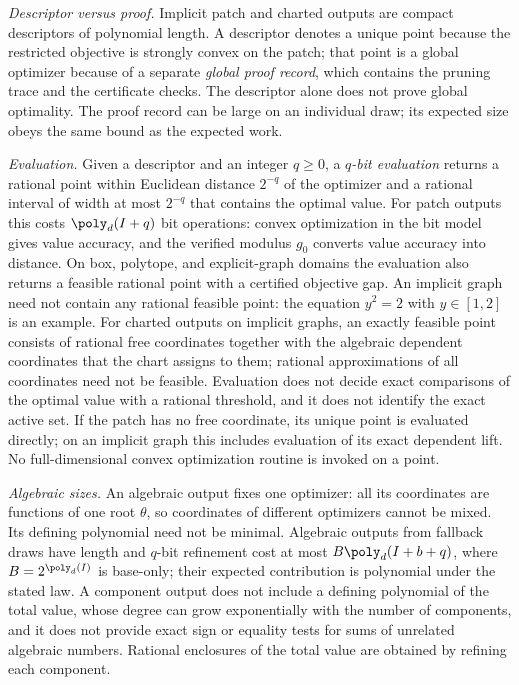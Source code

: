 \emph{Descriptor versus proof.} Implicit patch and charted outputs are
compact descriptors of polynomial length. A descriptor denotes a unique
point because the restricted objective is strongly convex on the patch;
that point is a global optimizer because of a separate \emph{global proof
record}, which contains the pruning trace and the certificate checks. The
descriptor alone does not prove global optimality. The proof record can be
large on an individual draw; its expected size obeys the same bound as the
expected work.

\emph{Evaluation.} Given a descriptor and an integer $q\ge0$, a
\emph{$q$-bit evaluation} returns a rational point within Euclidean distance $2^{-q}$
of the optimizer and a rational interval of width at most $2^{-q}$ that
contains the optimal value. For patch outputs this costs $\poly_d(I+q)$ bit
operations: convex optimization in the bit model gives value accuracy, and
the verified modulus $g_0$ converts value accuracy into distance. On box,
polytope, and explicit-graph domains the evaluation also returns a feasible
rational point with a certified objective gap. An implicit graph need not
contain any rational feasible point: the equation $y^2=2$ with $y\in[1,2]$
is an example. For charted outputs on implicit graphs, an exactly feasible
point consists of rational free coordinates together with the algebraic
dependent coordinates that the chart assigns to them; rational
approximations of all coordinates need not be feasible. Evaluation does not
decide exact comparisons of the optimal value with a rational threshold,
and it does not identify the exact active set.
If the patch has no free coordinate, its unique point is evaluated directly;
on an implicit graph this includes evaluation of its exact dependent lift.
No full-dimensional convex optimization routine is invoked on a point.

\emph{Algebraic sizes.} An algebraic output fixes one optimizer: all its
coordinates are functions of one root $\theta$, so coordinates of different
optimizers cannot be mixed. Its defining polynomial need not be minimal.
Algebraic outputs from fallback draws have length and $q$-bit refinement cost
at most $B\poly_d(I+b+q)$, where $B=2^{\poly_d(I)}$ is base-only; their
expected contribution is polynomial under the stated law. A component output does not include a
defining polynomial of the total value, whose degree can grow exponentially
with the number of components, and it does not provide exact sign or
equality tests for sums of unrelated algebraic numbers. Rational
enclosures of the total value are obtained by refining each component.

